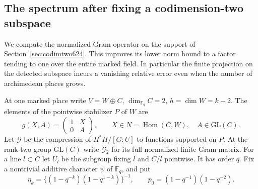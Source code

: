 \documentclass[a4paper,11pt]{article}
\theoremstyle{definition}
\theoremstyle{remark}
\numberwithin{equation}{section}
\begin{document}
\subsection{The spectrum after fixing a codimension-two subspace}
\label{sec:markedfourier625}

We compute the normalized Gram operator on the support of
Section~\ref{sec:codimtwo624}. This improves its lower norm
bound to a factor tending to one over the entire marked field.
In particular the finite projection on the detected subspace
incurs a vanishing relative error even when the number of
archimedean places grows.

At one marked place write \(V=W\oplus C\),
\(\dim_{\mathbb F_q}C=2\), \(h=\dim W=k-2\).
The elements of the pointwise stabilizer \(P\) of \(W\) are
\[
 g(X,A)=\begin{pmatrix}1&X\\0&A\end{pmatrix},
 \qquad X\in N=\operatorname{Hom}(C,W),\quad A\in\mathrm{GL}(C).
\]
Let \(\mathcal G\) be the compression of \(H^*H/[G:U]\) to
functions supported on \(P\). At the rank-two group
\(\mathrm{GL}(C)\) write \(\mathcal G_2\) for its full normalized
finite Gram matrix. For a line \(l\subset C\) let \(U_l\)
be the subgroup fixing \(l\) and \(C/l\) pointwise.
It has order \(q\). Fix a nontrivial additive character
\(\psi\) of \(\mathbb F_q\), and put
\[
   \eta_k=\{(1-q^{-k})(1-q^{1-k})\}^{-1},
             \qquad p_0=(1-q^{-1})(1-q^{-2}).
\]
\end{document}
